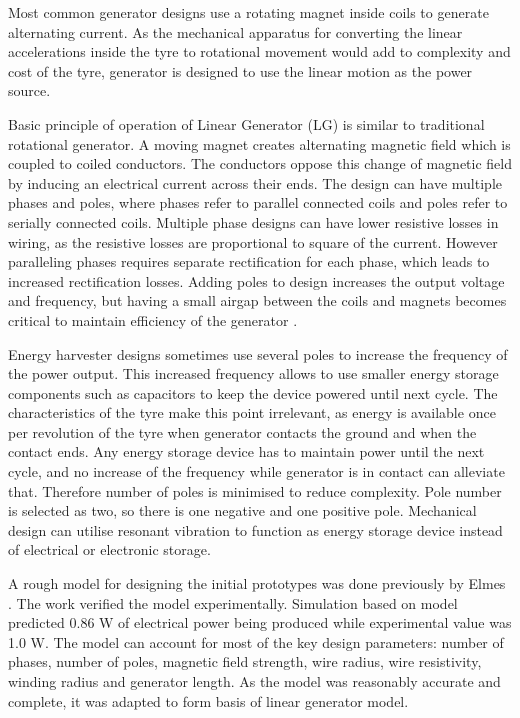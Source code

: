 Most common generator designs use a rotating magnet inside coils to generate alternating current. As the mechanical apparatus for converting the linear accelerations inside the tyre to rotational movement would add to complexity and cost of the tyre, generator is designed to use the linear motion as the power source.

Basic principle of operation of Linear Generator (LG) is similar to traditional rotational generator. A moving magnet creates alternating magnetic field which is coupled to coiled conductors. The conductors oppose this change of magnetic field by inducing an electrical current across their ends. The design can have multiple phases and poles, where phases refer to parallel connected coils and poles refer to serially connected coils. Multiple phase designs can have lower resistive losses in wiring, as the resistive losses are proportional to square of the current. However paralleling phases requires separate rectification for each phase, which leads to increased rectification losses. Adding poles to design increases the output voltage and frequency, but having a small airgap between the coils and magnets becomes critical to maintain efficiency of the generator \cite{Cheng2008}. 

Energy harvester designs sometimes use several poles to increase the frequency of the power output. This increased frequency allows to use smaller energy storage components such as capacitors to keep the device powered until next cycle. The characteristics of the tyre make this point irrelevant, as energy is available once per revolution of the tyre when generator contacts the ground and when the contact ends. Any energy storage device has to maintain power until the next cycle, and no increase of the frequency while generator is in contact can alleviate that. Therefore number of poles is minimised to reduce complexity. Pole number is selected as two, so there is one negative and one positive pole. Mechanical design can utilise resonant vibration to function as energy storage device instead of electrical or electronic storage.

A rough model for designing the initial prototypes was done previously by Elmes \cite{Elmes2005}. The work verified the model experimentally. Simulation based on model predicted 0.86 W of electrical power being produced while experimental value was 1.0 W. The model can account for most of the key design parameters: number of phases, number of poles, magnetic field strength, wire radius, wire resistivity, winding radius and generator length. As the model was reasonably accurate and complete, it was adapted to form basis of linear generator model. 

